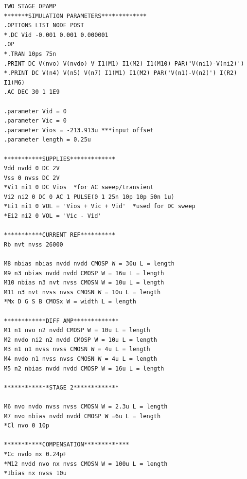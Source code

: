 \documentclass[12pt]{article}
\begin{document}
\begin{lstlisting}
TWO STAGE OPAMP
*******SIMULATION PARAMETERS*************
.OPTIONS LIST NODE POST
*.DC Vid -0.001 0.001 0.000001
.OP
*.TRAN 10ps 75n
.PRINT DC V(nvo) V(nvdo) V I1(M1) I1(M2) I1(M10) PAR('V(ni1)-V(ni2)')
*.PRINT DC V(n4) V(n5) V(n7) I1(M1) I1(M2) PAR('V(n1)-V(n2)') I(R2) I1(M6)
.AC DEC 30 1 1E9

.parameter Vid = 0
.parameter Vic = 0
.parameter Vios = -213.913u ***input offset
.parameter length = 0.25u

***********SUPPLIES*************
Vdd nvdd 0 DC 2V
Vss 0 nvss DC 2V
*Vi1 ni1 0 DC Vios	*for AC sweep/transient
Vi2 ni2 0 DC 0 AC 1 PULSE(0 1 25n 10p 10p 50n 1u)
*Ei1 ni1 0 VOL = 'Vios + Vic + Vid'  *used for DC sweep
*Ei2 ni2 0 VOL = 'Vic - Vid'

***********CURRENT REF**********
Rb nvt nvss 26000

M8 nbias nbias nvdd nvdd CMOSP W = 30u L = length
M9 n3 nbias nvdd nvdd CMOSP W = 16u L = length
M10 nbias n3 nvt nvss CMOSN W = 10u L = length
M11 n3 nvt nvss nvss CMOSN W = 10u L = length
*Mx D G S B CMOSx W = width L = length

************DIFF AMP*************
M1 n1 nvo n2 nvdd CMOSP W = 10u L = length
M2 nvdo ni2 n2 nvdd CMOSP W = 10u L = length 
M3 n1 n1 nvss nvss CMOSN W = 4u L = length
M4 nvdo n1 nvss nvss CMOSN W = 4u L = length
M5 n2 nbias nvdd nvdd CMOSP W = 16u L = length

*************STAGE 2*************

M6 nvo nvdo nvss nvss CMOSN W = 2.3u L = length
M7 nvo nbias nvdd nvdd CMOSP W =6u L = length
*Cl nvo 0 10p

***********COMPENSATION*************
*Cc nvdo nx 0.24pF
*M12 nvdd nvo nx nvss CMOSN W = 100u L = length
*Ibias nx nvss 10u


\end{lstlisting}
\end{document}
